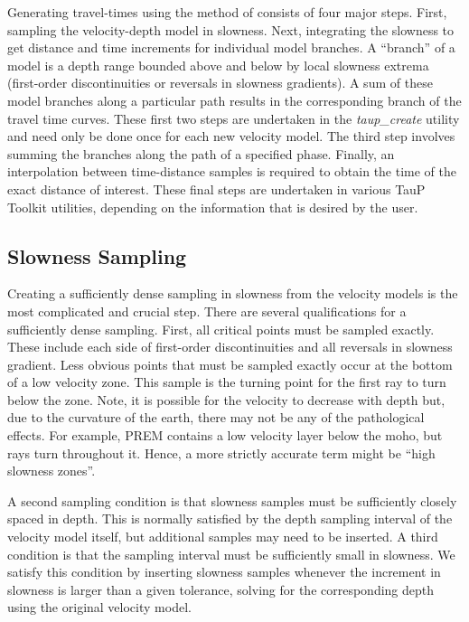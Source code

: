 Generating travel-times using the method of  consists of four
major steps.
First, sampling the velocity-depth model in slowness.
Next, integrating the slowness to get distance and time increments for individual
model branches.  
A ``branch'' of a model is a depth range bounded above and below by
local slowness extrema (first-order discontinuities or reversals in slowness
gradients). A sum of these model branches along a particular path results 
in the corresponding branch of the travel time curves.
These first two steps are undertaken in the \textit{taup\_create}
utility and need only
be done once for each new velocity model.
The third step involves summing the branches along the path of a 
specified phase.
Finally, an interpolation between time-distance samples is required to obtain the time
of the exact distance of interest.
These final steps are undertaken in various TauP Toolkit utilities, depending on the
information that is desired by the user.

\subsection*{Slowness Sampling}

Creating a sufficiently dense sampling in slowness from the velocity models is the
most complicated and crucial step.  
There are several qualifications for a sufficiently dense sampling.  
First, all critical points must be sampled exactly.
These include each side of first-order discontinuities and all reversals in slowness
gradient.
Less obvious points that must be sampled exactly occur at 
the bottom of a low velocity zone. 
This sample is the turning point for the first ray to turn below the zone. 
Note, it is possible for the velocity to decrease with depth but, due to the 
curvature of the earth, there may not be any of the pathological effects. 
For example, PREM \cite{prem} contains a low velocity layer below the moho, but rays turn
throughout it. Hence, a more strictly accurate term might be ``high slowness zones''.

A second sampling condition is that slowness samples must be sufficiently closely
spaced in depth.  This is normally satisfied by the depth sampling interval of the
velocity model itself, but additional samples may need to be inserted.  
A third condition is that the sampling interval must be
sufficiently small in slowness.  We satisfy this condition by 
inserting slowness samples whenever the increment in slowness is larger than
a given tolerance, solving for the corresponding depth using the original
velocity model.

